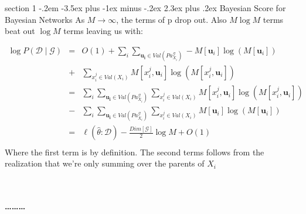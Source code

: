 \documentclass[12pt]{article}
\makeatletter
\newenvironment{problem}{\@startsection
       {section}
       {1}
       {-.2em}
       {-3.5ex plus -1ex minus -.2ex}
       {2.3ex plus .2ex}
       {\pagebreak[3]%
       \large\bf\noindent{Problem }
       }
       }
       {%
       \begin{center}\large\bf \ldots\ldots\ldots\end{center}}
\makeatother
\begin{document}
\begin{problem}{Bayesian Score for Bayesian Networks}
As $M \rightarrow \infty$, the terms of p drop out. Also $M \log M$ terms beat out $\log M$ terms leaving us with:

\begin{eqnarray*}
\log P( \mathcal{D} \mid \mathcal{G}) 
& = & O(1) + \sum_{i} \sum_{\mathbf{u_{i}} \in Val(Pa^{\mathcal{G}}_{X_{i}})} 
	-M[ \mathbf{u}_{i}] \log (M[ \mathbf{u}_{i}])\\
	&+& \sum_{x_{i}^{j} \in Val(X_{i})} 
	M[ x_{i}^{j},\mathbf{u}_{i}] \log (M[ x_{i}^{j},\mathbf{u}_{i}]) \\
& = & \sum_{i} \sum_{\mathbf{u_{i}} \in Val(Pa^{\mathcal{G}}_{X_{i}})} \sum_{x_{i}^{j} \in Val(X_{i})} 
	M[ x_{i}^{j},\mathbf{u}_{i}] \log (M[ x_{i}^{j},\mathbf{u}_{i}])\\
	& - &\sum_{i} \sum_{\mathbf{u_{i}} \in Val(Pa^{\mathcal{G}}_{X_{i}})} \sum_{x_{i}^{j} \in Val(X_{i})} 
	M[ \mathbf{u}_{i}] \log (M[ \mathbf{u}_{i}])\\
& = & \ell (\hat{\theta}: \mathcal{D}) -  \frac{Dim[\mathcal{G}]}{2} \log M + O(1)\\
\end{eqnarray*}
Where the first term is by definition. The second terms follows from the realization that we're only summing over the parents of $X_i$
\\   
\\ 
\\   

\end{problem}
\end{document}
